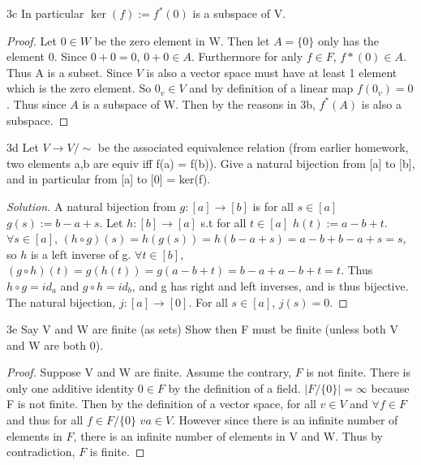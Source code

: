 \documentclass{article}
\newcommand{\abs}[1]{\lvert #1\rvert}
\newcommand{\rarr}[0]{\rightarrow}
\newenvironment{solution}
  {\renewcommand\qedsymbol{$\blacksquare$}\begin{proof}[Solution]}
  {\end{proof}}
\begin{document}
\begin{PROB}{3c}\label{Problem 3c.}
	In particular $\ker(f) := f^*({0})$ is a subspace of V.
\end{PROB}
\begin{proof}
	Let $0 \in W$ be the zero element in W. Then let $A = \{0\}$ only has the element 0. Since $0 + 0 = 0$, $0 + 0 \in A$. Furthermore for anly $f \in F$, $f*(0) \in A$. Thus A is a subset. Since $V$ is also a vector space must have at least 1 element which is the zero element. So $0_v \in V$ and by definition of a linear map $f(0_v) = 0$. Thus since $A$ is a subspace of W. Then by the reasons in 3b, $f^*(A)$ is also a subspace. 
\end{proof}

\begin{PROB}{3d}\label{Problem 3d.}
	Let $V \rarr V/\sim$ be the associated equivalence relation (from earlier homework, two elements a,b are equiv iff f(a) = f(b)).  Give a natural bijection from [a] to [b], and in particular from [a] to [0] = ker(f). 
\end{PROB}
\begin{solution}
	A natural bijection from $g: [a] \rarr [b]$ is for all $s \in [a]$ $g(s) := b - a + s$. Let $h: [b] \rarr [a]$ s.t for all $t \in [a]$ $h(t) := a - b + t$. $\forall s \in [a]$, $(h \circ g)(s) = h(g(s)) = h(b - a + s) = a - b + b - a + s = s$, so $h$ is a left inverse of g. $\forall t \in [b]$, $(g \circ h)(t) = g(h(t)) = g(a - b + t) = b - a + a - b + t = t$. Thus $h \circ g = id_a$ and $ g \circ h = id_b$, and g has right and left inverses, and is thus bijective. The natural bijection, $j: [a] \rarr [0]$. For all $s \in [a]$, $j(s) = 0$.
\end{solution}

\begin{PROB}{3e}\label{Problem 3e.}
	Say V and W are finite (as sets) Show then F must be finite (unless both V and W are both {0}). 
\end{PROB}
\begin{proof}
	Suppose V and W are finite. Assume the contrary, $F$ is not finite. There is only one additive identity $0 \in F$ by the definition of a field. $\abs{F/\{0\}} = \infty$ because F is not finite. Then by the definition of a vector space, for all $v \in V$ and $\forall f \in F$ and thus for all $f \in F/\{0\}$ $va \in V$. However since there is an infinite number of elements in $F$, there is an infinite number of elements in V and W. Thus by contradiction, $F$ is finite.
\end{proof}
\end{document}
